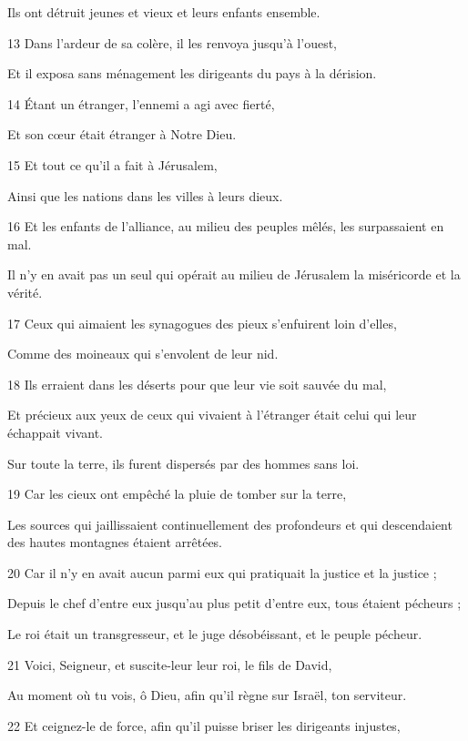 \par     Ils ont détruit jeunes et vieux et leurs enfants ensemble.
\par 13 Dans l'ardeur de sa colère, il les renvoya jusqu'à l'ouest,
\par     Et il exposa sans ménagement les dirigeants du pays à la dérision.
\par 14 Étant un étranger, l'ennemi a agi avec fierté,
\par     Et son cœur était étranger à Notre Dieu.
\par 15 Et tout ce qu'il a fait à Jérusalem,
\par     Ainsi que les nations dans les villes à leurs dieux.
\par   
\par 16 Et les enfants de l'alliance, au milieu des peuples mêlés, les surpassaient en mal.
\par     Il n’y en avait pas un seul qui opérait au milieu de Jérusalem la miséricorde et la vérité.
\par 17 Ceux qui aimaient les synagogues des pieux s'enfuirent loin d'elles,
\par     Comme des moineaux qui s'envolent de leur nid.
\par 18 Ils erraient dans les déserts pour que leur vie soit sauvée du mal,
\par     Et précieux aux yeux de ceux qui vivaient à l’étranger était celui qui leur échappait vivant.
\par     Sur toute la terre, ils furent dispersés par des hommes sans loi.
\par 19 Car les cieux ont empêché la pluie de tomber sur la terre,
\par     Les sources qui jaillissaient continuellement des profondeurs et qui descendaient des hautes montagnes étaient arrêtées.
\par 20 Car il n'y en avait aucun parmi eux qui pratiquait la justice et la justice ;
\par     Depuis le chef d’entre eux jusqu’au plus petit d’entre eux, tous étaient pécheurs ;
\par     Le roi était un transgresseur, et le juge désobéissant, et le peuple pécheur.
\par 21 Voici, Seigneur, et suscite-leur leur roi, le fils de David,
\par     Au moment où tu vois, ô Dieu, afin qu'il règne sur Israël, ton serviteur.
\par 22 Et ceignez-le de force, afin qu'il puisse briser les dirigeants injustes,
